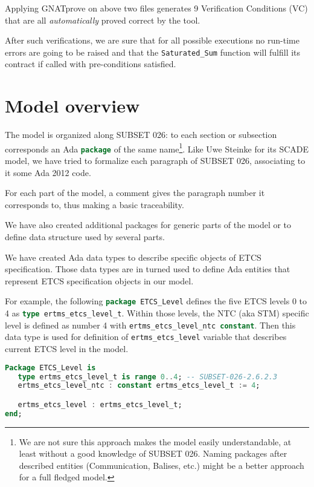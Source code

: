 \documentclass{template/openetcs_report}
\newcommand{\Ada}[1]{\lstinline[language=Ada,basicstyle={\sffamily},framesep=0pt]{#1}}
\begin{document}


Applying GNATprove on above two files generates 9 Verification
Conditions (VC) that are all \emph{automatically} proved correct by
the tool.

After such verifications, we are sure that for all possible executions
no run-time errors are going to be raised and that the
\Ada{Saturated_Sum} function will fulfill its contract if called with
pre-conditions satisfied.

\chapter{Model overview}

The model is organized along SUBSET 026: to each section or subsection
corresponds an Ada \Ada{package} of the same name\footnote{We are not
  sure this approach makes the model easily understandable, at least
  without a good knowledge of SUBSET 026. Naming packages after
  described entities (Communication, Balises, etc.) might be a better
  approach for a full fledged model.}. Like Uwe Steinke for its SCADE
model, we have tried to formalize each paragraph of SUBSET 026,
associating to it some Ada 2012 code.

For each part of the model, a comment gives the paragraph number it
corresponds to, thus making a basic traceability.

We have also created additional packages for generic parts of the
model or to define data structure used by several parts.

We have created Ada data types to describe specific objects of ETCS
specification. Those data types are in turned used to define Ada
entities that represent ETCS specification objects in our model.

For example, the following \Ada{package ETCS_Level} defines the five
ETCS levels 0 to 4 as \Ada{type ertms_etcs_level_t}. Within those
levels, the NTC (aka STM) specific level is defined as number 4 with
\Ada{ertms_etcs_level_ntc constant}. Then this data type is used for
definition of \Ada{ertms_etcs_level} variable that describes current
ETCS level in the model.

\begin{lstlisting}[language=Ada]
Package ETCS_Level is
   type ertms_etcs_level_t is range 0..4; -- SUBSET-026-2.6.2.3
   ertms_etcs_level_ntc : constant ertms_etcs_level_t := 4;

   ertms_etcs_level : ertms_etcs_level_t;
end;
\end{lstlisting}
\end{document}
